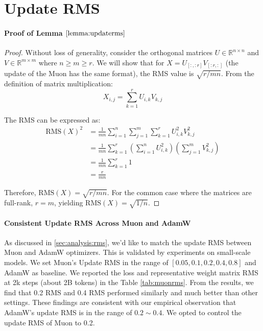 \section{Update RMS}
\label{sec:appendix:updaterms}

\paragraph{Proof of Lemma $\ref{lemma:updaterms}$}

\begin{proof}
Without loss of generality, consider the orthogonal matrices $U\in\mathbb{R}^{n\times n}$ and $V\in\mathbb{R}^{m\times m}$ where $n \geq m \geq r$. We will show that for $X=U_{[:,:r]}V_{[:r,:]}$ (the update of the Muon has the same format), the RMS value is $\sqrt{r/mn}$. From the definition of matrix multiplication:
$$X_{i,j}=\sum_{k=1}^r U_{i,k}V_{k,j}$$

The RMS can be expressed as:
$$\begin{aligned}
\text{RMS}(X)^2 &= \frac{1}{mn}\sum_{i=1}^n\sum_{j=1}^m \sum_{k=1}^r U_{i,k}^2V_{k,j}^2 \\
&= \frac{1}{mn}\sum_{k=1}^r\left(\sum_{i=1}^n U_{i,k}^2\right)\left(\sum_{j=1}^m V_{k,j}^2\right) \\
&= \frac{1}{mn}\sum_{k=1}^r 1 \\
&= \frac{r}{mn}
\end{aligned}$$

Therefore, $\text{RMS}(X)=\sqrt{r/mn}$. For the common case where the matrices are full-rank, $r=m$, yielding $\text{RMS}(X)=\sqrt{1/n}$.
\end{proof}


\paragraph{Consistent Update RMS Across Muon and AdamW}
As discussed in \ref{sec:analysis:rms}, we'd like to match the update RMS between Muon and AdamW optimizers. This is validated by experiments on small-scale models. We set Muon's Update RMS in the range of $[0.05, 0.1, 0.2, 0.4, 0.8]$ and AdamW as baseline. We reported the loss and representative weight matrix RMS at 2k steps (about 2B tokens) in the Table \ref{tab:muonrms}. From the results, we find that 0.2 RMS and 0.4 RMS performed similarly and much better than other settings. These findings are consistent with our empirical observation that AdamW's update RMS is in the range of $0.2\sim0.4$. We opted to control the update RMS of Muon to 0.2.


